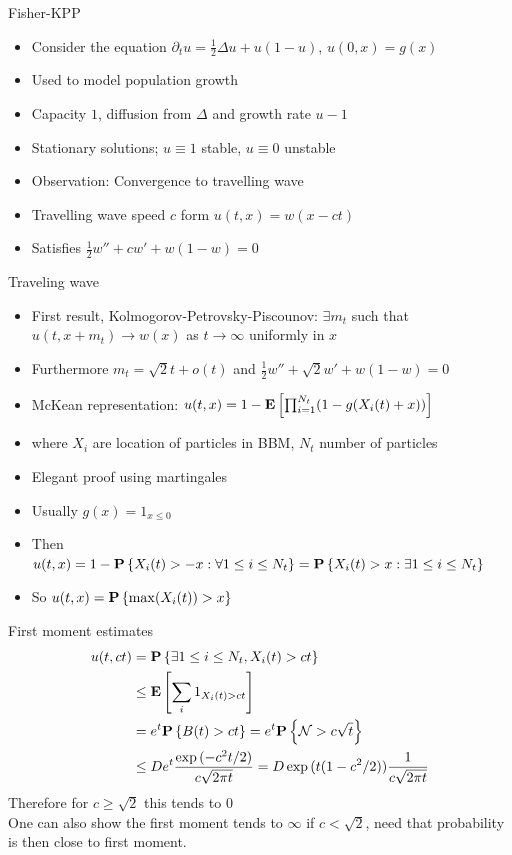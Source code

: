 \documentclass{beamer}
\begin{document}
\begin{frame}{Fisher-KPP}
    \begin{itemize}
        \item Consider the equation $\partial_tu=\frac{1}{2}\Delta u+u(1-u)$, $u(0,x)=g(x)$
        \item Used to model population growth
        \item Capacity $1$, diffusion from $\Delta$ and growth rate $u-1$
        \item Stationary solutions; $u\equiv1$ stable, $u\equiv0$ unstable
        \item Observation: Convergence to travelling wave
        \item Travelling wave speed $c$ form $u(t,x)=w(x-ct)$
        \item Satisfies $\frac{1}{2}w''+cw'+w(1-w)=0$
    \end{itemize}
\end{frame}


\begin{frame}{Traveling wave}
    \begin{itemize}
        \item First result, Kolmogorov-Petrovsky-Piscounov: $\exists m_t$ such that $u(t,x+m_t)\rightarrow w(x)$ as $t\rightarrow\infty$ uniformly in $x$
        \item Furthermore $m_t=\sqrt{2}t+o(t)$ and $\frac{1}{2}w''+\sqrt{2}w'+w(1-w)=0$
        \item McKean representation: $u(t,x)=1-{\mathbf E}\left[\prod_{i=1}^{N_t}(1-g(X_i(t)+x))\right]$
        \item where $X_i$ are location of particles in BBM, $N_t$ number of particles
        \item Elegant proof using martingales
        \item Usually $g(x)=1_{x\leq0}$
        \item Then $u(t,x)=1-{\mathbf P}\left\{X_i(t)>-x: \forall 1\leq i\leq N_t\right\}={\mathbf P}\left\{X_i(t)>x: \exists 1\leq i\leq N_t\right\}$
        \item So $u(t,x)={\mathbf P}\left\{\max(X_i(t))>x\right\}$
    \end{itemize}
    
\end{frame}


\begin{frame}{First moment estimates}
    \begin{align*}
        u(t,ct)&={\mathbf P}\left\{\exists 1\leq i\leq N_t, X_i(t)>ct\right\}\\
        &\leq{\mathbf E}\left[\sum_i1_{X_i(t)>ct}\right]\\
        &=e^t{\mathbf P}\left\{B(t)>ct\right\}=e^t{\mathbf P}\left\{\mathcal N>c\sqrt{t}\right\}\\
        &\leq De^t\frac{\exp{(-c^2t/2)}}{c\sqrt{2\pi t}}= D\exp{(t(1-c^2/2))}\frac{1}{c\sqrt{2\pi t}}
    \end{align*}
    Therefore for $c\geq\sqrt{2}$ this tends to $0$\\
    One can also show the first moment tends to $\infty$ if $c<\sqrt{2}$, need that probability is then close to first moment.
\end{frame}
\end{document}
